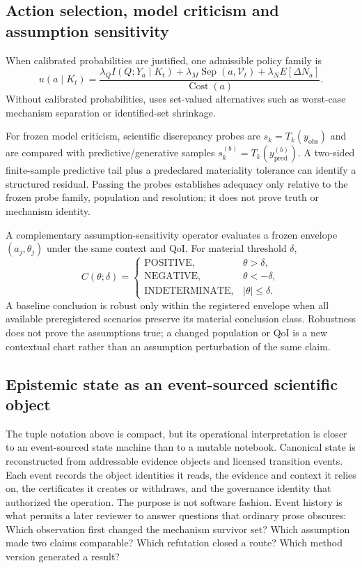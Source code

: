 \subsection{Action selection, model criticism and assumption sensitivity}
When calibrated probabilities are justified, one admissible policy family is
\begin{equation}u(a\mid K_t)=\frac{\lambda_Q I(Q;Y_a\mid K_t)+\lambda_M\operatorname{Sep}(a,\mathcal V_t)+\lambda_N E[\Delta N_a]}{\operatorname{Cost}(a)}.\end{equation}
Without calibrated probabilities, \RAKL{} uses set-valued alternatives such as worst-case mechanism separation or identified-set shrinkage.

For frozen model criticism, scientific discrepancy probes are $s_k=T_k(y_{\mathrm{obs}})$ and are compared with predictive/generative samples $s_k^{(b)}=T_k(y_{\mathrm{pred}}^{(b)})$. A two-sided finite-sample predictive tail plus a predeclared materiality tolerance can identify a structured residual. Passing the probes establishes adequacy only relative to the frozen probe family, population and resolution; it does not prove truth or mechanism identity.

A complementary assumption-sensitivity operator evaluates a frozen envelope $(a_j,\theta_j)$ under the same context and QoI. For material threshold $\delta$,
\begin{equation}
C(\theta;\delta)=
\begin{cases}
\mathrm{POSITIVE}, & \theta>\delta,\\
\mathrm{NEGATIVE}, & \theta<-\delta,\\
\mathrm{INDETERMINATE}, & |\theta|\le\delta.
\end{cases}
\end{equation}
A baseline conclusion is robust only within the registered envelope when all available preregistered scenarios preserve its material conclusion class. Robustness does not prove the assumptions true; a changed population or QoI is a new contextual chart rather than an assumption perturbation of the same claim.

\subsection{Epistemic state as an event-sourced scientific object}

The tuple notation above is compact, but its operational interpretation is closer to an event-sourced state machine than to a mutable notebook. Canonical state is reconstructed from addressable evidence objects and licensed transition events. Each event records the object identities it reads, the evidence and context it relies on, the certificates it creates or withdraws, and the governance identity that authorized the operation. The purpose is not software fashion. Event history is what permits a later reviewer to answer questions that ordinary prose obscures: Which observation first changed the mechanism survivor set? Which assumption made two claims comparable? Which refutation closed a route? Which method version generated a result?

